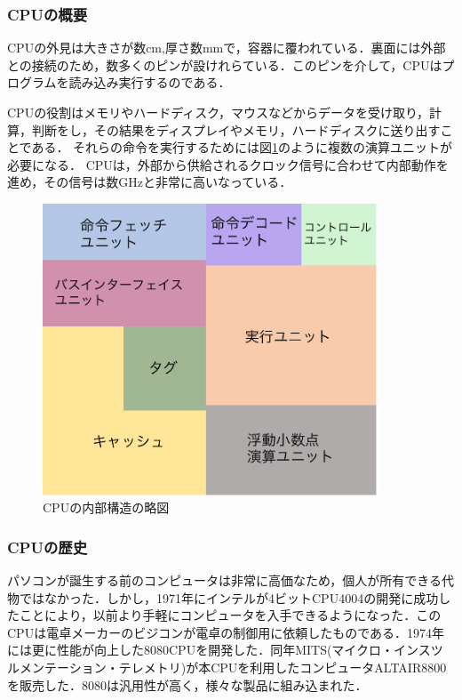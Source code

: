 \documentclass[a4j,12pt]{jsarticle}
\begin{document}
\subsubsection{CPUの概要}
CPUの外見は大きさが数cm,厚さ数mmで，容器に覆われている．裏面には外部との接続のため，数多くのピンが設けれらている．このピンを介して，CPUはプログラムを読み込み実行するのである．

CPUの役割はメモリやハードディスク，マウスなどからデータを受け取り，計算，判断をし，その結果をディスプレイやメモリ，ハードディスクに送り出すことである．
それらの命令を実行するためには図\ref{fig:cpu}のように複数の演算ユニットが必要になる．
CPUは，外部から供給されるクロック信号に合わせて内部動作を進め，その信号は数GHzと非常に高いなっている．

\begin{figure}[htbp]
 \begin{center}
  \includegraphics[width=100mm]{CPU.pdf}
 \end{center}
 \caption{CPUの内部構造の略図}
 \label{fig:cpu}
\end{figure}

\subsubsection{CPUの歴史}
パソコンが誕生する前のコンピュータは非常に高価なため，個人が所有できる代物ではなかった．しかし，1971年にインテルが4ビットCPU4004の開発に成功したことにより，以前より手軽にコンピュータを入手できるようになった．このCPUは電卓メーカーのビジコンが電卓の制御用に依頼したものである．1974年には更に性能が向上した8080CPUを開発した．同年MITS(マイクロ・インスツルメンテーション・テレメトリ)が本CPUを利用したコンピュータALTAIR8800を販売した．8080は汎用性が高く，様々な製品に組み込まれた．
\end{document}
